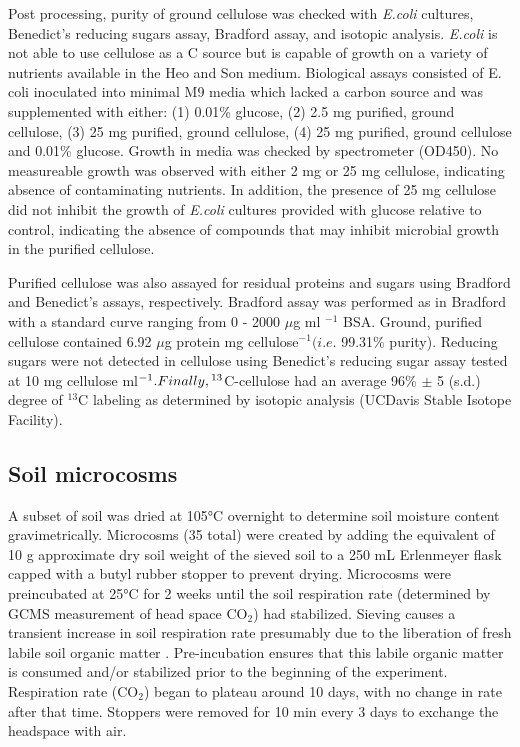 Post processing, purity of ground cellulose was checked with \textit{E.coli}
cultures, Benedict's reducing sugars assay, Bradford assay, and isotopic
analysis. \textit{E.coli} is not able to use cellulose as a C source but is
capable of growth on a variety of nutrients available in the Heo and Son
medium.  Biological assays consisted of E. coli inoculated into minimal M9
media which lacked a carbon source and was supplemented with either: (1) 0.01\%
glucose, (2) 2.5 mg purified, ground cellulose, (3) 25 mg purified, ground
cellulose, (4) 25 mg purified, ground cellulose and 0.01\% glucose. Growth in
media was checked by spectrometer (OD450). No measureable growth was observed
with either 2 mg or 25 mg cellulose, indicating absence of contaminating
nutrients. In addition, the presence of 25 mg cellulose did not inhibit the
growth of \textit{E.coli} cultures provided with glucose relative to control,
indicating the absence of compounds that may inhibit microbial growth in the
purified cellulose. 

Purified cellulose was also assayed for residual proteins and sugars using
Bradford and Benedict's assays, respectively. Bradford assay was performed as
in Bradford \cite{Bradford_1976} with a standard curve ranging from 0 - 2000
$\mu$g ml $^{-1}$ BSA. Ground, purified cellulose contained 6.92
$\mu$g protein mg cellulose$^{-1} (\textit{i.e.}$ 99.31\% purity).
Reducing sugars were not detected in cellulose using Benedict's reducing sugar
assay \cite{benedict1909reagent} tested at 10 mg cellulose
ml$^{-1}. Finally, \textsuperscript{13}$C-cellulose had an average
96\% $\pm$ 5 (s.d.) degree of $^{13}$C labeling as determined by
isotopic analysis (UCDavis Stable Isotope Facility).           

\subsection{Soil microcosms}
A subset of soil was dried at 105°C overnight to determine soil moisture
content gravimetrically. Microcosms (35 total) were created by adding the
equivalent of 10 g approximate dry soil weight of the sieved soil to a 250 mL
Erlenmeyer flask capped with a butyl rubber stopper to prevent drying.
Microcosms were preincubated at 25°C for 2 weeks until the soil respiration
rate (determined by GCMS measurement of head space CO$_{2}$) had stabilized.
Sieving causes a transient increase in soil respiration rate presumably due to
the liberation of fresh labile soil organic matter \cite{Datta_2014}.
Pre-incubation ensures that this labile organic matter is consumed and/or
stabilized prior to the beginning of the experiment. Respiration rate
(CO$_{2}$) began to plateau around 10 days, with no change in rate after that
time. Stoppers were removed for 10 min every 3 days to exchange the headspace
with air. 

